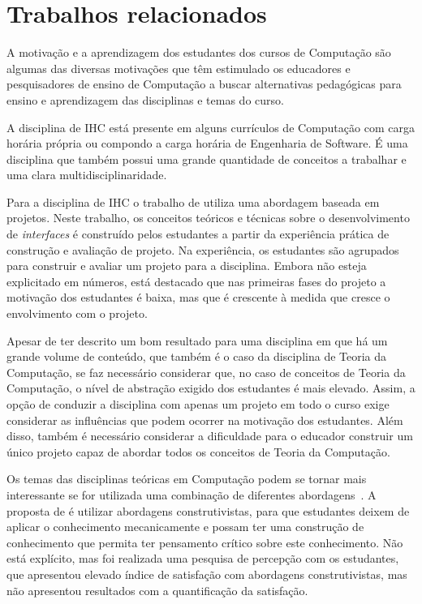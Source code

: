\section{Trabalhos relacionados}
\label{sec-revisao-relacionados}
A motivação e a aprendizagem dos estudantes dos cursos
de Computação são algumas das diversas motivações que têm
estimulado os educadores e pesquisadores de ensino de Computação
a buscar alternativas pedagógicas para ensino e aprendizagem
das disciplinas e temas do curso.



A disciplina de \ac{IHC} está presente em
alguns currículos de Computação com carga horária
própria ou compondo a carga horária de Engenharia de Software.
É uma disciplina que também possui uma grande quantidade de conceitos
a trabalhar e uma clara multidisciplinaridade.

Para a disciplina de \ac{IHC} o trabalho de 
utiliza uma abordagem baseada em projetos.
Neste trabalho, os conceitos teóricos e técnicas
sobre o desenvolvimento de \textit{interfaces} é construído
pelos estudantes a partir da experiência prática
de construção e avaliação de projeto.
Na experiência, os estudantes são agrupados para construir e
avaliar um projeto para a disciplina.
Embora não esteja explicitado em números, está destacado que nas
primeiras fases do projeto a motivação dos estudantes é baixa,
mas que é crescente à medida que cresce o envolvimento com
o projeto.

Apesar de ter descrito um bom resultado para
uma disciplina em que há um grande volume de conteúdo,
que também é o caso da disciplina de Teoria da Computação,
se faz necessário considerar que, no caso de conceitos de
Teoria da Computação, o nível de abstração exigido dos estudantes
é mais elevado.
Assim, a opção de conduzir a disciplina com apenas
um projeto em todo o curso exige considerar as influências
que podem ocorrer na motivação dos estudantes.
Além disso, também é necessário considerar a dificuldade para o
educador construir um único projeto capaz de abordar todos os
conceitos de Teoria da Computação.

Os temas das disciplinas teóricas em Computação podem
se tornar mais interessante se for utilizada uma combinação
de diferentes abordagens~\cite{chesnevar2004didactic}.
A proposta de  é utilizar
abordagens construtivistas, para que estudantes deixem
de aplicar o conhecimento mecanicamente e possam ter
uma construção de conhecimento que permita ter pensamento
crítico sobre este conhecimento.
Não está explícito, mas foi realizada uma pesquisa
de percepção com os estudantes, que apresentou elevado índice
de satisfação com abordagens construtivistas, mas não
apresentou resultados com a quantificação da satisfação.

